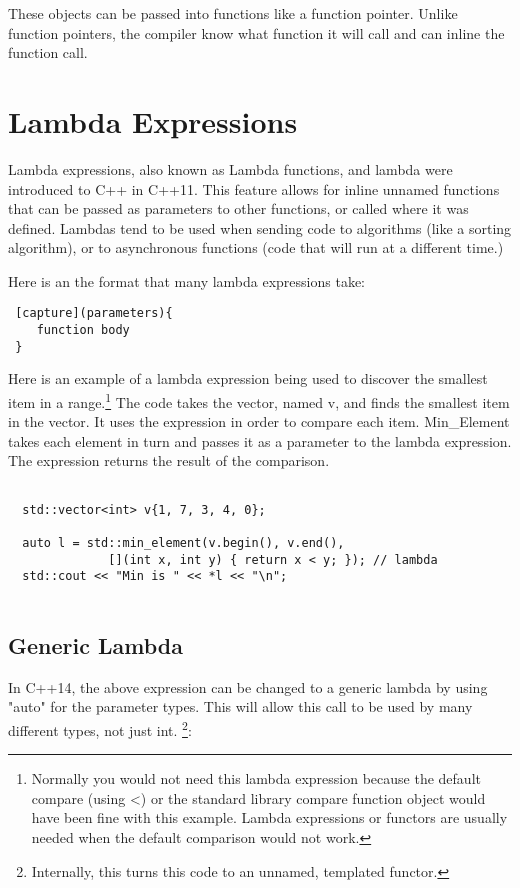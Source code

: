 These objects can be passed into functions like a function
pointer. Unlike function pointers, the compiler know what
function it will call and can inline the function call.
\section{Lambda Expressions}
Lambda expressions, also known as Lambda functions, and lambda were introduced to C++ in C++11.
This feature allows for inline unnamed functions that can be passed as parameters to other functions, or called where it was defined. Lambdas tend to be used when sending code to algorithms (like a sorting algorithm), or to asynchronous functions (code that will run at a different time.)

Here is an the format that many lambda expressions take:
\begin{verbatim}
 [capture](parameters){
    function body
 }
\end{verbatim}

Here is an example of a lambda expression being used to discover the smallest item in a range.\footnote{Normally you would not need this lambda expression because the default compare (using \textless) or the standard library compare function object would have been fine with this example. Lambda expressions or functors are usually needed when the default comparison would not work.} The code takes the vector, named v, and finds the smallest
item in the vector. It uses the expression in order to compare each item. Min\_Element
takes each element in turn and passes it as a parameter to the lambda expression. The
expression returns the result of the comparison.

\begin{lstlisting}

  std::vector<int> v{1, 7, 3, 4, 0};

  auto l = std::min_element(v.begin(), v.end(), 
              [](int x, int y) { return x < y; }); // lambda
  std::cout << "Min is " << *l << "\n";
  
\end{lstlisting}

\subsection{Generic Lambda}
In C++14, the above expression can be changed to a generic lambda by using "auto" for the parameter types. This will allow this call to be used by many different types, not just int. \footnote{Internally, this turns this code to an unnamed, templated functor.}:

